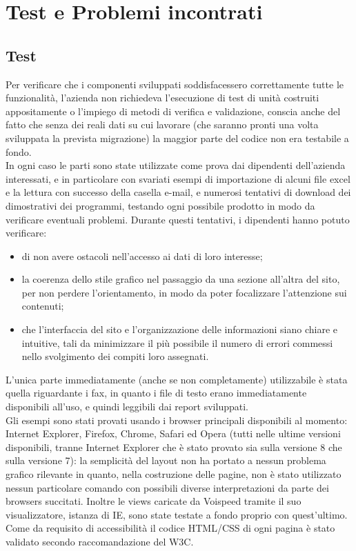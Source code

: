 \chapter{Test e Problemi incontrati}
\section{Test}
Per verificare che i componenti sviluppati soddisfacessero correttamente tutte le funzionalit\`a, l'azienda non richiedeva l'esecuzione di test di unit\`a costruiti appositamente o l'impiego di metodi di verifica e validazione, conscia anche del fatto che senza dei reali dati su cui lavorare (che saranno pronti una volta sviluppata la prevista migrazione) la maggior parte del codice non era testabile a fondo.\\
 In ogni caso le parti sono state utilizzate come prova dai dipendenti dell'azienda interessati, e in particolare con svariati esempi di importazione di alcuni file excel e la lettura con successo della casella e-mail, e numerosi tentativi di download dei dimostrativi dei programmi, testando ogni possibile prodotto in modo da verificare eventuali problemi. Durante questi tentativi, i dipendenti hanno potuto verificare:
\begin{itemize}
 \item di non avere ostacoli nell'accesso ai dati di loro interesse; 
 \item la coerenza dello stile grafico nel passaggio da una sezione all'altra del sito, per non perdere l'orientamento, in modo da poter focalizzare l'attenzione sui contenuti;
 \item che l’interfaccia del sito e l’organizzazione delle informazioni siano chiare e intuitive, tali da minimizzare il pi\`u possibile il numero di errori commessi nello svolgimento dei compiti loro assegnati.
\end{itemize}
\noindent
L'unica parte immediatamente (anche se non completamente) utilizzabile \`e stata quella riguardante i fax, in quanto i file di testo erano immediatamente disponibili all'uso, e quindi leggibili dai report sviluppati. \\
Gli esempi sono stati provati usando i browser principali disponibili al momento: Internet Explorer, Firefox, Chrome, Safari ed Opera (tutti nelle ultime versioni disponibili, tranne Internet Explorer che \`e stato provato sia sulla versione 8 che sulla versione 7): la semplicit\`a del layout non ha portato a nessun problema grafico rilevante in quanto, nella costruzione delle pagine, non \`e stato utilizzato nessun particolare comando con possibili diverse interpretazioni da parte dei browsers succitati. Inoltre le views caricate da Voispeed tramite il suo visualizzatore, istanza di IE, sono state testate a fondo proprio con quest'ultimo. \\
Come da requisito di accessibilit\`a il codice HTML/CSS di ogni pagina \`e stato validato secondo raccomandazione del W3C. 


